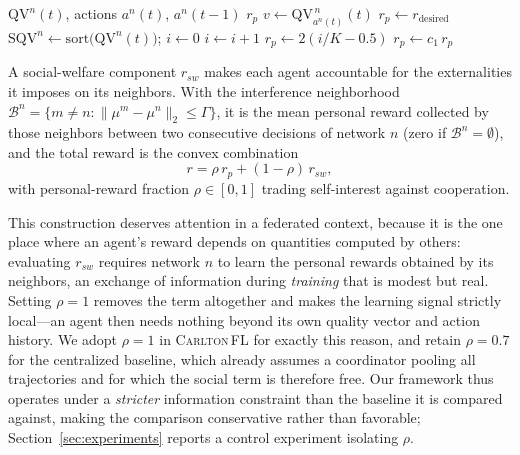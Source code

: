 \documentclass[journal]{IEEEtran}
\newcommand{\OURS}{\textsc{Carlton\,FL}}
\begin{document}
\begin{algorithm}[!t]
\caption{Personal reward $r_{p}$ of network $\mathcal{N}^{n}$}
\label{alg:rp}
\begin{algorithmic}[1]
\Require $\mathrm{QV}^{n}(t)$, actions $a^{n}(t)$, $a^{n}(t-1)$
\Ensure  $r_{p}$
\State $v \gets \mathrm{QV}^{\,n}_{a^{n}(t)}(t)$
  \State $r_{p} \gets r_{\mathrm{desired}}$
\Else
  \State $\mathrm{SQV}^{n} \gets \mathrm{sort}\bigl(\mathrm{QV}^{n}(t)\bigr)$;\;
         $i \gets 0$
    \State $i \gets i+1$
  \EndWhile
  \State $r_{p} \gets 2\left(i/K - 0.5\right)$
\EndIf
{}
  \State $r_{p} \gets c_{1}\, r_{p}$ 
\EndIf
\end{algorithmic}
\end{algorithm}

A social-welfare component $r_{sw}$ makes each agent accountable for the
externalities it imposes on its neighbors. With the interference neighborhood
$\mathcal{B}^{n}=\{m\neq n : \lVert \mu^{m}-\mu^{n}\rVert_{2}\leq \Gamma\}$,
it is the mean personal reward collected by those neighbors between two
consecutive decisions of network $n$ (zero if $\mathcal{B}^{n}=\emptyset$), and
the total reward is the convex combination
\begin{equation}
r = \rho\, r_{p} + (1-\rho)\, r_{sw},
\label{eq:reward}
\end{equation}
with personal-reward fraction $\rho\in[0,1]$ trading self-interest against
cooperation.

This construction deserves attention in a federated context, because it is the
one place where an agent's reward depends on quantities computed by others:
evaluating $r_{sw}$ requires network $n$ to learn the personal rewards obtained
by its neighbors, an exchange of information during \emph{training} that is
modest but real. Setting $\rho = 1$ removes the term altogether and makes the
learning signal strictly local---an agent then needs nothing beyond its own
quality vector and action history. We adopt $\rho = 1$ in \OURS{} for exactly
this reason, and retain $\rho = 0.7$ for the centralized baseline, which
already assumes a coordinator pooling all trajectories and for which the social
term is therefore free. Our framework thus operates under a \emph{stricter}
information constraint than the baseline it is compared against, making the
comparison conservative rather than favorable;
Section~\ref{sec:experiments} reports a control experiment isolating $\rho$.
\end{document}
